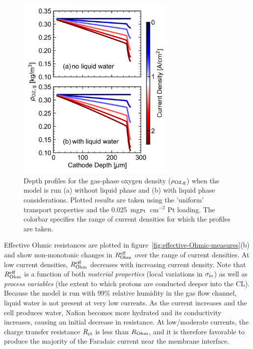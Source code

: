 \documentclass[final,3p,times,twocolumn]{elsarticle}    %
\newcommand{\crr}[1]{\color{red} #1 \color{black}}
\begin{document}
\begin{figure}[!tb]
    \centering
    \includegraphics[width=3.07in]{figures_uniform/o2-grads-3_07in.png}
    \crr{
    \caption{Depth profiles for the gas-phase oxygen density ($\rho_{\rm O2, g}$) when the model is run (a) without liquid phase and (b) with liquid phase considerations. Plotted results are taken using the 'uniform' transport properties and the 0.025~mg$_{\rm Pt}$~cm$^{-2}$ Pt loading. The colorbar specifies the range of current densities for which the profiles are taken.}}
    \label{fig:o2-grads-with-flooding}
\end{figure}

Effective Ohmic resistances are plotted in figure~\ref{fig:effective-Ohmic-measures}(b) and show non-monotonic changes in $R_{\rm Ohm}^{\rm eff}$ over the range of current densities. At low current densities, $R_{\rm Ohm}^{\rm eff}$ decreases with increasing current density. Note that $R_{\rm Ohm}^{\rm eff}$ is a function of both \emph{material properties} (local variations in $\sigma_{\rm io}$) as well as \emph{process variables} (the extent to which protons are conducted deeper into the CL). Because the model is run with 99\% relative humidity in the gas flow channel, liquid water is not present at very low currents. As the current increases and the cell produces water, Nafion becomes more hydrated and its conductivity increases, causing an initial decrease in resistance. At low/moderate currents, the charge transfer resistance $R_{\rm ct}$ is less than $R_{\rm Ohm}$, and it is therefore favorable to produce the majority of the Faradaic current near the membrane interface.
\end{document}
